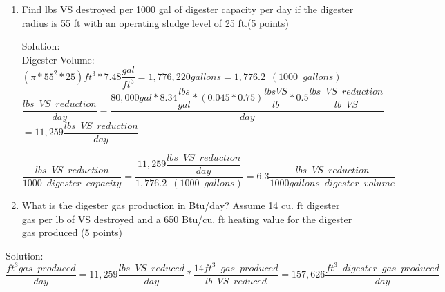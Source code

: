 \begin{enumerate}
\begin{enumerate}
\item Find lbs VS destroyed per 1000 gal of digester capacity per day if the digester radius is 55 ft with an operating sludge level of 25 ft.(5 points)

\vspace{1cm}
Solution:\\
Digester Volume: 
$
{
		(\pi*55^2*25)ft^3 *7.48 \dfrac{gal}{ft^3}
	}=1,776,220 gallons=1,776.2 \enspace(1000 \enspace gallons)
$
\\
\vspace{3mm}
$
	\dfrac
	{
	lbs \enspace VS \enspace reduction
	}
	{
	day
	}
	=
	\dfrac
	{
	80,000 gal * 8.34 \dfrac{lbs}{gal}*(0.045*0.75) \dfrac{lbs VS}{lb}*0.5\dfrac{lbs \enspace VS \enspace  reduction}{lb \enspace VS}
	}
	{
	day
	}$\\
\vspace{0.25cm}
$
 	=11,259
	\dfrac
	{
	lbs \enspace VS \enspace reduction
	}
	{
	day 
	}
$
\\
\vspace{3mm}


$
	\dfrac
	{
	lbs \enspace VS \enspace reduction
	}
	{
	1000 \enspace digester \enspace capacity
	}
	=
	\dfrac
	{
	11,259 \dfrac
			{
			lbs \enspace VS \enspace reduction
			}
			{
			day
			}
	}
	{	
	1,776.2 \enspace (1000 \enspace gallons)
	}
 	=\boxed{6.3
	\dfrac
	{
	lbs \enspace VS \enspace reduction
	}
	{
	1000 gallons \enspace digester \enspace volume 
	}}
$
\\

\vspace{1cm}

\item  What is the digester gas production in Btu/day? Assume 14 cu. ft digester gas per lb of VS destroyed and a 650 Btu/cu. ft heating value for the digester gas produced (5 points)
\end{enumerate}
\vspace{1cm}
Solution:\\

$
	\dfrac 
	{
	ft^3 gas \enspace produced
	}
	{
	day
	}
	=
	11,259 \dfrac
			{
			lbs \enspace VS \enspace reduced
			}
			{
			day
			}
			*
		\dfrac
		{
		14 ft^3 \enspace gas \enspace produced
		}
		{
		lb \enspace VS \enspace reduced
		}
		=157,626 \dfrac
				{
				ft^3 \enspace digester \enspace 					gas \enspace produced
				}
				{
				day
				}
$
\\
\vspace{1cm}



\end{enumerate}
